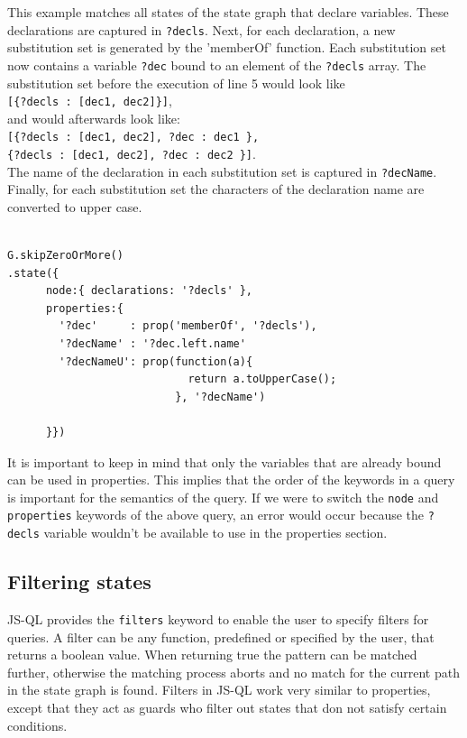 \begin{exmp}
\label{ex:Properties}
This example matches all states of the state graph that declare variables. These declarations are captured in \texttt{?decls}. Next, for each declaration, a new substitution set is generated by the 'memberOf' function. Each substitution set now contains a variable \texttt{?dec} bound to an element of the \texttt{?decls} array. The substitution set before the execution of line 5 would look like \\\texttt{[\{?decls : [dec1, dec2]\}]}, \\and would afterwards look like: \\\texttt{[\{?decls : [dec1, dec2], ?dec : dec1 \},\\\phantom{ }\{?decls : [dec1, dec2], ?dec : dec2 \}]}. \\The name of the declaration in each substitution set is captured in \texttt{?decName}. Finally, for each substitution set the characters of the declaration name are converted to upper case.

\begin{lstlisting}[label={lst:propertiesExample},language=JSQL,caption=Specifying additional properties in JS-QL,mathescape=true]  % float=t?

G.skipZeroOrMore()
.state({
      node:{ declarations: '?decls' },
      properties:{
        '?dec'     : prop('memberOf', '?decls'),  
        '?decName' : '?dec.left.name'             
        '?decNameU': prop(function(a){            
                            return a.toUpperCase();
                          }, '?decName')
      
      }})
\end{lstlisting}
\end{exmp}

It is important to keep in mind that only the variables that are already bound can be used in properties. This implies that the order of the keywords in a query is important for the semantics of the query. If we were to switch the \texttt{node} and \texttt{properties} keywords of the above query, an error would occur because the \texttt{?decls} variable wouldn't be available to use in the properties section.

\subsection{Filtering states}

JS-QL provides the \texttt{filters} keyword to enable the user to specify filters for queries. A filter can be any function, predefined or specified by the user, that returns a boolean value. When returning true the pattern can be matched further, otherwise the matching process aborts and no match for the current path in the state graph is found. Filters in JS-QL work very similar to properties, except that they act as guards who filter out states that don not satisfy certain conditions. 

